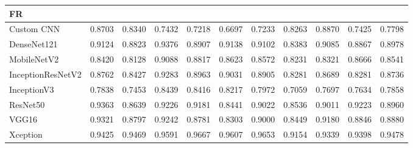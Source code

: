 \documentclass[a4paper,fleqn]{cas-dc}
\begin{document}
\begin{table}[t]
\begin{tabular}{l *{10}{r}}
        \midrule
        \multicolumn{11}{l}{\textbf{FR }} \\
        \midrule
        Custom CNN        & 0.8703 & 0.8340 & 0.7432 & 0.7218 & 0.6697 & 0.7233 & 0.8263 & 0.8870 & 0.7425 & 0.7798 \\
        DenseNet121       & 0.9124 & 0.8823 & 0.9376 & 0.8907 & 0.9138 & 0.9102 & 0.8383 & 0.9085 & 0.8867 & 0.8978 \\
        MobileNetV2       & 0.8420 & 0.8128 & 0.9088 & 0.8817 & 0.8623 & 0.8572 & 0.8231 & 0.8321 & 0.8666 & 0.8541 \\
        InceptionResNetV2 & 0.8762 & 0.8427 & 0.9283 & 0.8963 & 0.9031 & 0.8905 & 0.8281 & 0.8689 & 0.8281 & 0.8736 \\
        InceptionV3       & 0.7838 & 0.7453 & 0.8439 & 0.8416 & 0.8217 & 0.7972 & 0.7059 & 0.7697 & 0.7634 & 0.7858 \\
        ResNet50          & 0.9363 & 0.8639 & 0.9226 & 0.9181 & 0.8441 & 0.9022 & 0.8536 & 0.9011 & 0.9223 & 0.8960 \\
        VGG16             & 0.9321 & 0.8797 & 0.9242 & 0.8781 & 0.8303 & 0.9000 & 0.8449 & 0.9180 & 0.8846 & 0.8880 \\
        Xception          & 0.9425 & 0.9469 & 0.9591 & 0.9667 & 0.9607 & 0.9653 & 0.9154 & 0.9339 & 0.9398 & 0.9478 \\

        \bottomrule
    \end{tabular}
\end{table}
\end{document}
